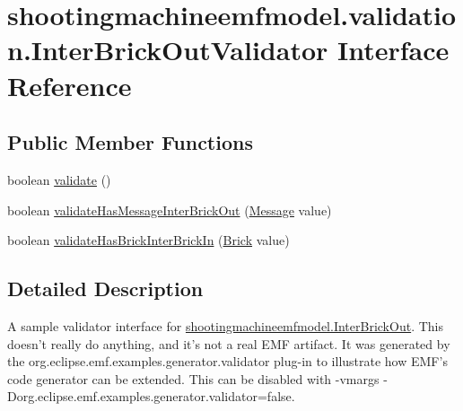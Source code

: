 \hypertarget{interfaceshootingmachineemfmodel_1_1validation_1_1_inter_brick_out_validator}{\section{shootingmachineemfmodel.\-validation.\-Inter\-Brick\-Out\-Validator Interface Reference}
\label{interfaceshootingmachineemfmodel_1_1validation_1_1_inter_brick_out_validator}
}
\subsection*{Public Member Functions}
\begin{DoxyCompactItemize}
\item 
boolean \hyperlink{interfaceshootingmachineemfmodel_1_1validation_1_1_inter_brick_out_validator_a88ce78c702ab8ef01ae57aeeefa60ad5}{validate} ()
\item 
boolean \hyperlink{interfaceshootingmachineemfmodel_1_1validation_1_1_inter_brick_out_validator_a53f76f6a7e18fe84553625553ba1d631}{validate\-Has\-Message\-Inter\-Brick\-Out} (\hyperlink{interfaceshootingmachineemfmodel_1_1_message}{Message} value)
\item 
boolean \hyperlink{interfaceshootingmachineemfmodel_1_1validation_1_1_inter_brick_out_validator_a5a16f8047153f420e23fded818e65ab5}{validate\-Has\-Brick\-Inter\-Brick\-In} (\hyperlink{interfaceshootingmachineemfmodel_1_1_brick}{Brick} value)
\end{DoxyCompactItemize}


\subsection{Detailed Description}
A sample validator interface for \hyperlink{interfaceshootingmachineemfmodel_1_1_inter_brick_out}{shootingmachineemfmodel.\-Inter\-Brick\-Out}. This doesn't really do anything, and it's not a real E\-M\-F artifact. It was generated by the org.\-eclipse.\-emf.\-examples.\-generator.\-validator plug-\/in to illustrate how E\-M\-F's code generator can be extended. This can be disabled with -\/vmargs -\/\-Dorg.\-eclipse.\-emf.\-examples.\-generator.\-validator=false. 

